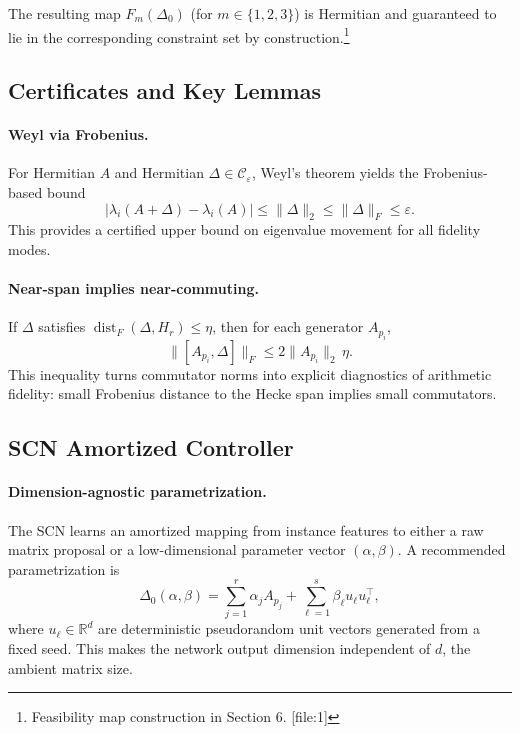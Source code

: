 \documentclass[11pt]{article}
\begin{document}
The resulting map \(F_m(\Delta_0)\) (for \(m\in\{1,2,3\}\)) is Hermitian and guaranteed to lie in the corresponding constraint set by construction.\footnote{Feasibility map construction in Section 6. [file:1]}

\subsection{Certificates and Key Lemmas}

\paragraph{Weyl via Frobenius.} For Hermitian \(A\) and Hermitian \(\Delta\in\mathcal{C}_\varepsilon\), Weyl's theorem yields the Frobenius-based bound
\[
|\lambda_i(A+\Delta) - \lambda_i(A)| \le \|\Delta\|_2 \le \|\Delta\|_F \le \varepsilon.
\]
This provides a certified upper bound on eigenvalue movement for all fidelity modes.

\paragraph{Near-span implies near-commuting.} If \(\Delta\) satisfies \(\operatorname{dist}_F(\Delta,H_r)\le \eta\), then for each generator \(A_{p_i}\),
\[
\|[A_{p_i},\Delta]\|_F \le 2\|A_{p_i}\|_2\,\eta.
\]
This inequality turns commutator norms into explicit diagnostics of arithmetic fidelity: small Frobenius distance to the Hecke span implies small commutators.%

\subsection{SCN Amortized Controller}

\paragraph{Dimension-agnostic parametrization.} The SCN learns an amortized mapping from instance features to either a raw matrix proposal or a low-dimensional parameter vector \((\alpha,\beta)\). A recommended parametrization is
\[
\Delta_0(\alpha,\beta)
  = \sum_{j=1}^r \alpha_j A_{p_j}
    + \sum_{\ell=1}^s \beta_\ell u_\ell u_\ell^\top,
\]
where \(u_\ell \in \mathbb{R}^d\) are deterministic pseudorandom unit vectors generated from a fixed seed. This makes the network output dimension independent of \(d\), the ambient matrix size.
\end{document}
